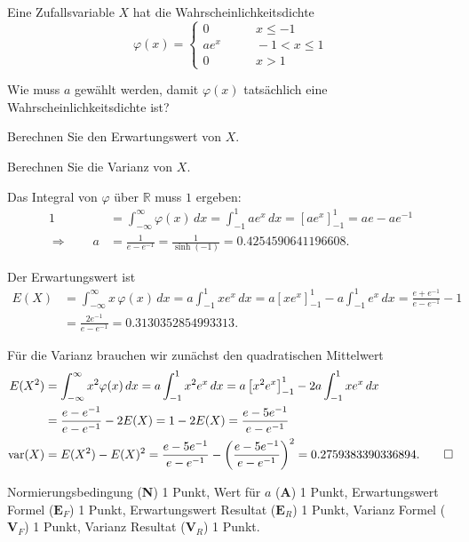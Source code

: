 Eine Zufallsvariable $X$ hat die Wahrscheinlichkeitsdichte
\[
\varphi(x)=\begin{cases}
0&\qquad x\le -1\\
ae^x&\qquad -1<x\le 1\\
0&\qquad x > 1
\end{cases}
\]
\begin{teilaufgaben}
\item Wie muss $a$ gewählt werden, damit $\varphi(x)$ tatsächlich eine
Wahrscheinlichkeitsdichte ist?
\item Berechnen Sie den Erwartungswert von $X$.
\item Berechnen Sie die Varianz von $X$.
\end{teilaufgaben}

\begin{loesung}
\begin{teilaufgaben}
\item
Das Integral von $\varphi$ über $\mathbb R$ muss $1$ ergeben:
\begin{align*}
1
&=
\int_{-\infty}^{\infty} \varphi(x)\,dx
=
\int_{-1}^1ae^x\,dx
=
\left[ae^x\right]_{-1}^1
=
ae-ae^{-1}
\\
\Rightarrow\qquad
a&=\frac1{e-e^{-1}}=\frac1{\sinh(-1)}
=
0.4254590641196608.
\end{align*}
\item
Der Erwartungswert ist
\begin{align*}
E(X)
&=
\int_{-\infty}^\infty x\,\varphi(x)\,dx
=
a\int_{-1}^1xe^x\,dx
=
a\left[xe^x\right]_{-1}^1-a\int_{-1}^1e^x\,dx
=
\frac{e+e^{-1}}{e-e^{-1}}-1
\\
&=
\frac{2e^{-1}}{e-e^{-1}}
=
0.3130352854993313.
\end{align*}
\item
Für die Varianz brauchen wir zunächst den quadratischen Mittelwert
\begin{align*}
E(X^2)
&=
\int_{-\infty}^\infty x^2\varphi(x)\, dx
=
a\int_{-1}^1 x^2e^x\,dx
=
a\left[x^2e^x\right]_{-1}^1
-
2a\int_{-1}^1xe^x\,dx
\\
&=
\frac{e-e^{-1}}{e-e^{-1}}
-2E(X)
=
1-2E(X)
=
\frac{e-5e^{-1}}{e-e^{-1}}
\\
\operatorname{var}(X)
&=
E(X^2)-E(X)^2
=
\frac{e-5e^{-1}}{e-e^{-1}}
-
\biggl(
\frac{e-5e^{-1}}{e-e^{-1}}
\biggr)^2
=
0.2759383390336894.
\qedhere
\end{align*}
\end{teilaufgaben}
\end{loesung}

\begin{bewertung}
Normierungsbedingung ({\bf N}) 1 Punkt,
Wert für $a$ ({\bf A}) 1 Punkt,
Erwartungswert Formel ($\textbf{E}_F$) 1 Punkt,
Erwartungswert Resultat ($\textbf{E}_R$) 1 Punkt,
Varianz Formel ($\textbf{V}_F$) 1 Punkt,
Varianz Resultat ($\textbf{V}_R$) 1 Punkt.
\end{bewertung}





